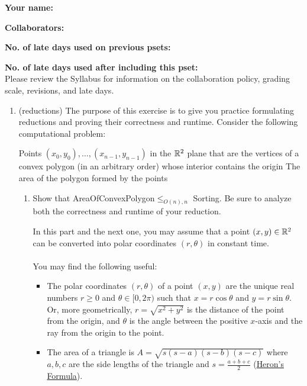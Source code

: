 \documentclass[11pt]{article}
\begin{document}

\textbf{Your name: }

\textbf{Collaborators: }

\textbf{No. of late days used on previous psets: }

\textbf{No. of late days used after including this pset: }
\\

Please review the Syllabus for information on the collaboration 
policy, grading scale, revisions, and late days.


\begin{enumerate}
     \item  (reductions) The purpose of this exercise is to give you practice formulating reductions and proving their correctness and runtime.
    Consider the following computational problem:

    {Points $(x_0,y_0),\ldots,(x_{n-1},y_{n-1})$ in the $\mathbb{R}^2$ plane that are the vertices of a convex polygon (in an arbitrary order) whose interior contains the origin}
    {The area of the polygon formed by the points}


    \begin{enumerate}
        \item \label{part:polar} 
        Show that AreaOfConvexPolygon$\leq_{O(n),n}$ Sorting.  Be sure to analyze both the correctness and runtime of your reduction.

        In this part and the next one, you may assume that a point $(x,y)\in \mathbb{R}^2$ can be converted into polar coordinates $(r,\theta)$ in constant time. 
        \\\\
        You may find the following useful:
        \begin{itemize}
            \item The polar coordinates $(r,\theta)$ of a point $(x,y)$ are the unique real numbers $r\geq 0$ and $\theta\in [0,2\pi)$ such that $x=r\cos \theta$ and $y=r\sin \theta$. Or, more geometrically, $r=\sqrt{x^2+y^2}$ is the distance of the point from the origin, and $\theta$ is the angle between the positive $x$-axis and the ray from the origin to the point.
            \item The area of a triangle is $A = \sqrt{s(s-a)(s-b)(s-c)}$ where $a, b, c$ are the side lengths of the triangle and $s = \frac{a + b + c}{2}$ (\href{https://en.wikipedia.org/wiki/Heron\%27s_formula}{Heron's Formula}).
        \end{itemize}
        

\end{enumerate}
\end{enumerate}
\end{document}
